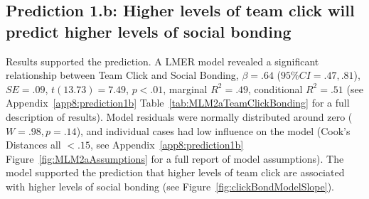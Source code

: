 \begin{CJK}{UTF8}{gbsn}









\subsection{Prediction 1.b: Higher levels of team click will predict higher levels of social bonding}

 Results supported the prediction.  A LMER model revealed a significant relationship between Team Click and Social Bonding, $\beta = .64$ ($95\% CI =  .47, .81$), $SE = .09$, $t(13.73) = 7.49$, $p < .01$, marginal $R^2 = .49$, conditional $R^2 = .51$ (see Appendix~\ref{app8:prediction1b} Table~\ref{tab:MLM2aTeamClickBonding} for a full description of results).
  Model residuals were normally distributed around zero ($W = .98, p = .14$), and individual cases had low influence on the model (Cook's Distances all $< .15$, see Appendix~\ref{app8:prediction1b} Figure~\ref{fig:MLM2aAssumptions} for a full report of model assumptions).
 The model supported the prediction that higher levels of team click are associated with higher levels of social bonding (see Figure~\ref{fig:clickBondModelSlope}).




\end{CJK}
